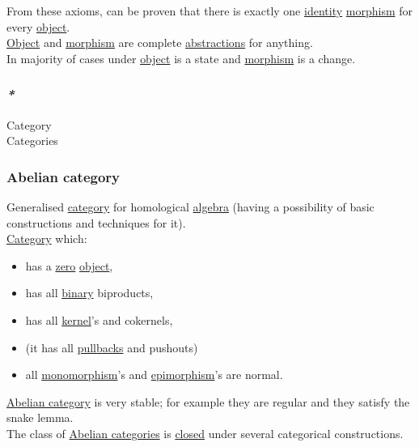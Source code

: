 \documentclass[11pt]{article}
\begin{document}
From these axioms, can be proven that there is exactly one \hyperref[org9b95fd5]{identity} \hyperref[org5de09d4]{morphism} for every \hyperref[org4be0e9d]{object}.\\

\hyperref[org4be0e9d]{Object} and \hyperref[org5de09d4]{morphism} are complete \hyperref[orgc16d079]{abstractions} for anything.\\
In majority of cases under \hyperref[org4be0e9d]{object} is a state and \hyperref[org5de09d4]{morphism} is a change.\\

\subsubsection{\emph{*}}
\label{sec:orgadf1166}

\label{org0450535}Category\\
\label{org2f49b91}Categories\\

\subsubsection{\label{org210691b}Abelian category}
\label{sec:org6a78fb4}
Generalised \hyperref[org0450535]{category} for homological \hyperref[orgecfec51]{algebra} (having a possibility of basic constructions and techniques for it).\\

\hyperref[org0450535]{Category} which:\\
\begin{itemize}
\item has a \hyperref[org5d1963a]{zero} \hyperref[org4be0e9d]{object},\\
\item has all \hyperref[org57bd48f]{binary} biproducts,\\
\item has all \hyperref[org8fd3800]{kernel}'s and cokernels,\\
\item (it has all \hyperref[org7462806]{pullbacks} and pushouts)\\
\item all \hyperref[orgfde2588]{monomorphism}'s and \hyperref[orgb5de842]{epimorphism}'s are normal.\\
\end{itemize}
\hyperref[org210691b]{Abelian category} is very stable; for example they are regular and they satisfy the snake lemma.\\
The class of \hyperref[org1d568c9]{Abelian categories} is \hyperref[orgcdd7006]{closed} under several categorical constructions.\\
\end{document}
